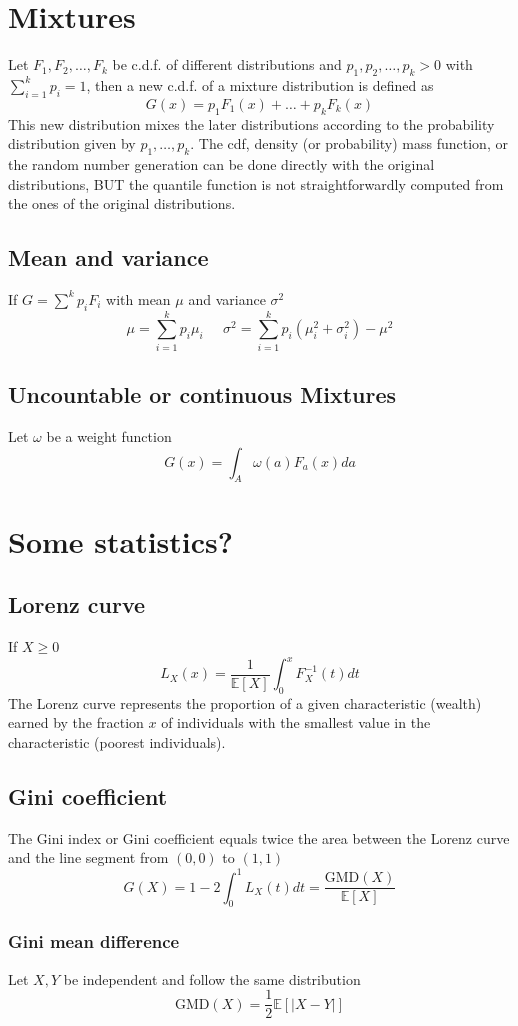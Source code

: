
\section{Mixtures}
Let $F_1,F_2,\dots,F_k$ be c.d.f. of different distributions and
$p_1,p_2,\dots,p_k>0$ with $\sum_{i=1}^kp_i=1$, then a new c.d.f. of a mixture
distribution is defined as
\[ G(x) = p_1F_1(x) + \dots + p_kF_k(x) \] This new distribution mixes the later
distributions according to the probability distribution given by
$p_1,\dots,p_k$. The cdf, density (or probability) mass function, or the random
number generation can be done directly with the original distributions, BUT the
quantile function is not straightforwardly computed from the ones of the original
distributions. 


\subsection{Mean and variance}
If $G=\sum^kp_iF_i$ with mean $\mu$ and variance $\sigma^2$
\[ \mu = \sum_{i=1}^k p_i\mu_i \;\;\;\;\;
    \sigma^2 = \sum_{i=1}^k p_i(\mu^2_i+\sigma^2_i)-\mu^2
\]

\subsection{Uncountable or continuous Mixtures}
Let $\omega$ be a weight function 
\[ G(x) = \int_A \omega(a)F_a(x)da \]

\section{Some statistics?}
\subsection{Lorenz curve}
If $X\geq 0$ 
\[ L_X(x) = \frac{1}{\mathbb{E}[X]}\int_0^x F^{-1}_X(t)dt \] The Lorenz curve
represents the proportion of a given characteristic (wealth) earned by the
fraction $x$ of individuals with the smallest value in the characteristic (poorest
individuals). 

\subsection{Gini coefficient}
The Gini index or Gini coefficient equals twice the area between the Lorenz curve
and the line segment from $(0,0)$ to $(1,1)$
\[ G(X) = 1-2\int_0^1L_X(t)dt = \frac{\text{GMD}(X)}{\mathbb{E}[X]} \]
\subsubsection{Gini mean difference}
Let $X,Y$ be independent and follow the same distribution
\[ \text{GMD}(X) = \frac{1}{2}\mathbb{E}[|X-Y|] \]


